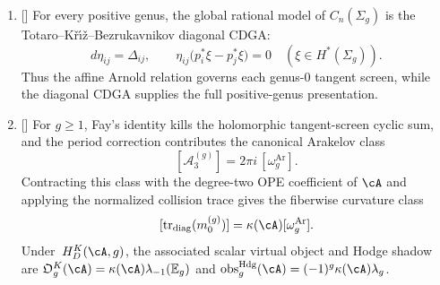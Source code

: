 \begin{theorem}
\begin{enumerate}
\item[\textup{(c)}] \textup{[\ClaimStatusProvedElsewhere]}
For every positive genus, the global rational model of
$C_n(\Sigma_g)$ is the
Totaro--K\v{r}\'{\i}\v{z}--Bezrukavnikov diagonal CDGA:
\[
d\eta_{ij}=\Delta_{ij},\qquad
\eta_{ij}\bigl(p_i^*\xi-p_j^*\xi\bigr)=0
\quad(\xi\in H^*(\Sigma_g)).
\]
Thus the affine Arnold relation governs each genus-$0$ tangent screen,
while the diagonal CDGA supplies the full positive-genus presentation.

\item[\textup{(d)}] \textup{[\ClaimStatusConditional]}
For $g\ge1$, Fay's identity kills the holomorphic tangent-screen
cyclic sum, and the period correction contributes the canonical
Arakelov class
\[
[\mathcal{A}_3^{(g)}]
=2\pi i\,[\omega_g^{\mathrm{Ar}}].
\]
Contracting this class with the degree-two OPE coefficient of
$\cA$ and applying the normalized collision trace gives the
fiberwise curvature class
\[
[\operatorname{tr}_{\mathrm{diag}}(m_0^{(g)})]
=
\kappa(\cA)[\omega_g^{\mathrm{Ar}}].
\]
Under~$H_D^K(\cA,g)$, the associated scalar virtual object and Hodge
shadow are
$\mathfrak O_g^K(\cA)=\kappa(\cA)\lambda_{-1}(\mathbb E_g)$ and
$\operatorname{obs}^{\mathrm{Hdg}}_g(\cA)
=(-1)^g\kappa(\cA)\lambda_g$.
\end{enumerate}
\end{theorem}

